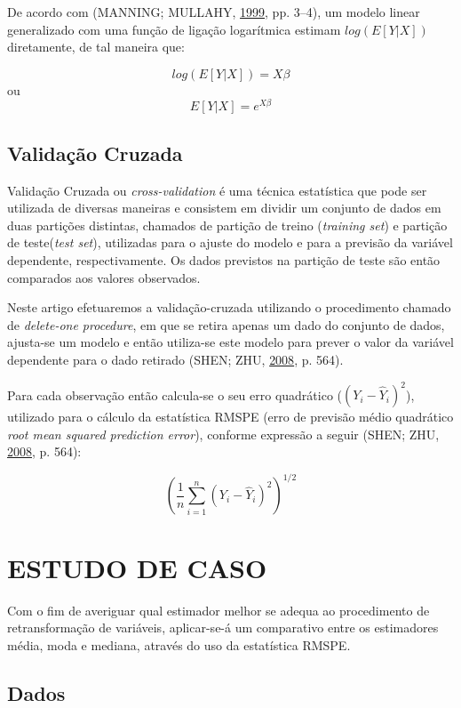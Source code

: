 \documentclass[a4paper]{article}
\begin{document}
De acordo com (MANNING; MULLAHY,
\protect\hyperlink{ref-NBERt0246}{1999}, pp. 3--4), um modelo linear
generalizado com uma função de ligação logarítmica estimam
\(log(E[Y|X])\) diretamente, de tal maneira que:

\[log(E[Y|X]) = X\beta\] ou \[E[Y|X] = e^{X\beta}\]

\subsection{Validação Cruzada}\label{validacao-cruzada}

Validação Cruzada ou \emph{cross-validation} é uma técnica estatística
que pode ser utilizada de diversas maneiras e consistem em dividir um
conjunto de dados em duas partições distintas, chamados de partição de
treino (\emph{training set}) e partição de teste(\emph{test set}),
utilizadas para o ajuste do modelo e para a previsão da variável
dependente, respectivamente. Os dados previstos na partição de teste são
então comparados aos valores observados.

Neste artigo efetuaremos a validação-cruzada utilizando o procedimento
chamado de \emph{delete-one procedure}, em que se retira apenas um dado
do conjunto de dados, ajusta-se um modelo e então utiliza-se este modelo
para prever o valor da variável dependente para o dado retirado (SHEN;
ZHU, \protect\hyperlink{ref-shen}{2008}, p. 564).

Para cada observação então calcula-se o seu erro quadrático
(\((Y_i - \hat{Y}_i)^2\)), utilizado para o cálculo da estatística RMSPE
(erro de previsão médio quadrático \emph{root mean squared prediction
error}), conforme expressão a seguir (SHEN; ZHU,
\protect\hyperlink{ref-shen}{2008}, p. 564):

\[(\frac{1}{n}\sum_{i = 1}^{n}(Y_i - \hat{Y}_i)^2)^{1/2}\]

\section{ESTUDO DE CASO}\label{estudo-de-caso}

Com o fim de averiguar qual estimador melhor se adequa ao procedimento
de retransformação de variáveis, aplicar-se-á um comparativo entre os
estimadores média, moda e mediana, através do uso da estatística RMSPE.

\subsection{Dados}\label{dados}
\end{document}
